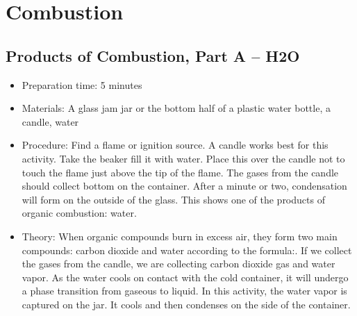 \section{Combustion}

\subsection{Products of Combustion, Part A – H2O}
\begin{itemize}
\item{Preparation time: 5 minutes}
\item{Materials: A glass jam jar or the bottom half of a plastic water bottle, a candle, water}
\item{Procedure: Find a flame or ignition source. A candle works best for this activity. Take the beaker fill it with water. Place this over the candle not to touch the flame just above the tip of the flame. The gases from the candle should collect bottom on the container. After a minute or two, condensation will form on the outside of the glass. This shows one of the products of organic combustion: water.}
\item{Theory: When organic compounds burn in excess air, they form two main compounds: carbon dioxide and water according to the formula:. If we collect the gases from the candle, we are collecting carbon dioxide gas and water vapor. As the water cools on contact with the cold container, it will undergo a phase transition from gaseous to liquid. In this activity, the water vapor is captured on the jar. It cools and then condenses on the side of the container.}
\end{itemize}


